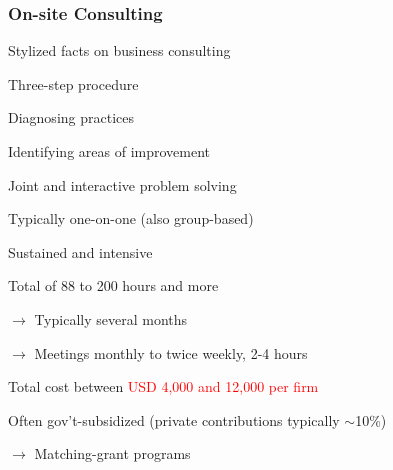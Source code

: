\documentclass[hideothersubsections, usenames,dvipsnames,11pt]{beamer}
\newenvironment{itemize_2pt}{\itemize\addtolength{\itemsep}{2pt}}{\enditemize}
\newenvironment{enumerate_2pt}{\enumerate\addtolength{\itemsep}{2pt}}{\endenumerate}
\begin{document}
\begin{frame}
\frametitle{On-site Consulting}

Stylized facts on business consulting
\begin{itemize_2pt}
	\item Three-step procedure
	\begin{enumerate_2pt}
		\item Diagnosing practices
		\item Identifying areas of improvement
		\item Joint and interactive problem solving
	\end{enumerate_2pt}
	
	\pause
	
	\item Typically one-on-one (also group-based)
	
	\item \textcolor{bdf}{Sustained and intensive}
	\begin{itemize_2pt}
		\item Total of 88 to 200 hours and more \citep{Anderson2020, Bruhn2018} %
		\item[] $\rightarrow$ Typically several months
		\item[] $\rightarrow$ Meetings monthly to twice weekly, 2-4 hours
		\item Total cost between \textcolor{red}{USD 4,000 and 12,000 per firm} \citep{Anderson2020, Bruhn2018}
	\end{itemize_2pt}
	
	\item \textcolor{bdf}{Often gov't-subsidized} (private contributions typically $\sim$10\%) \\
	\begin{itemize_2pt}
		\item[] $\rightarrow$ \textcolor{bdf}{Matching-grant programs}
	\end{itemize_2pt}
	
\end{itemize_2pt}
\end{frame}
\end{document}

